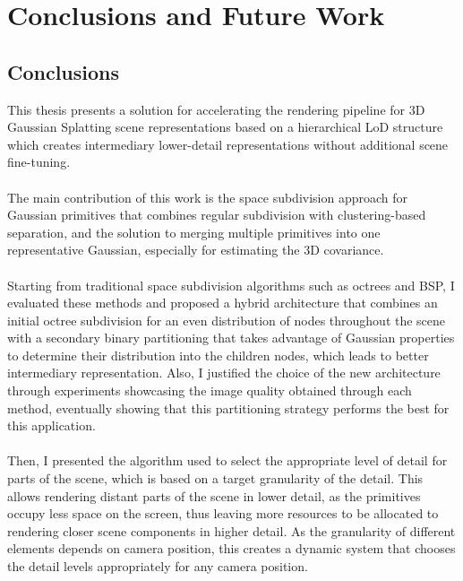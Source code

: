 \section{Conclusions and Future Work}
\subsection{Conclusions}
This thesis presents a solution for accelerating the rendering pipeline for 3D Gaussian Splatting scene representations based on a hierarchical LoD structure which creates intermediary lower-detail representations without additional scene fine-tuning.
\paragraph{}

The main contribution of this work is the space subdivision approach for Gaussian primitives that combines regular subdivision with clustering-based separation, and the solution to merging multiple primitives into one representative Gaussian, especially for estimating the 3D covariance. 
\paragraph{}

Starting from traditional space subdivision algorithms such as octrees and BSP, I evaluated these methods and proposed a hybrid architecture that combines an initial octree subdivision for an even distribution of nodes throughout the scene with a secondary binary partitioning that takes advantage of Gaussian properties to determine their distribution into the children nodes, which leads to better intermediary representation. Also, I justified the choice of the new architecture through experiments showcasing the image quality obtained through each method, eventually showing that this partitioning strategy performs the best for this application.
\paragraph{}

Then, I presented the algorithm used to select the appropriate level of detail for parts of the scene, which is based on a target granularity of the detail. This allows rendering distant parts of the scene in lower detail, as the primitives occupy less space on the screen, thus leaving more resources to be allocated to rendering closer scene components in higher detail. As the granularity of different elements depends on camera position, this creates a dynamic system that chooses the detail levels appropriately for any camera position.
